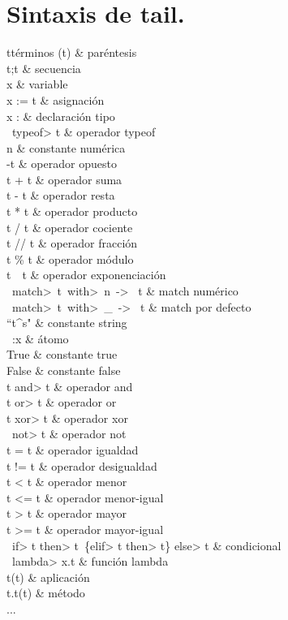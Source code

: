 \section{Sintaxis de tail.}
\label{apendice:sintaxis_tail}

\begin{grammar}{t}{términos}
(t)           & paréntesis \\
t;t           & secuencia \\
x             & variable \\
x := t        & asignación \\
x : \tau      & declaración tipo \\
\ \<typeof> t   & operador typeof \\
n             & constante numérica \\
-t            & operador opuesto \\
t + t         & operador suma \\
t - t         & operador resta \\
t * t         & operador producto \\
t / t         & operador cociente \\
t // t        & operador fracción \\
t \% t        & operador módulo \\
t\ \hat{}\ t & operador exponenciación \\
\ \<match>\ t\ \<with>\ n\ \mathligsoff -> \mathligson\ t & match numérico \\
\ \<match>\ t\ \<with>\ \_\ \mathligsoff -> \mathligson\ t & match por defecto \\
``t^s"         & constante string \\
\ :x            & átomo \\
True          & constante true \\
False          & constante false \\
t \<and> t        & operador and \\
t \<or> t         & operador or \\
t \<xor> t        & operador xor \\
\ \<not> t          & operador not \\
t = t          & operador igualdad \\
t != t         & operador desigualdad \\
t < t          & operador menor \\
t \mathligsoff <= \mathligson t         & operador menor-igual \\
t > t          & operador mayor \\
t >= t         & operador mayor-igual \\
\ \<if> t \<then> t\ \{\<elif> t \<then> t\} \<else> t & condicional \\
\ \<lambda> x.t     & función lambda \\
t(t)          & aplicación \\
t.t(t)        & método \\
... \\
\end{grammar}

